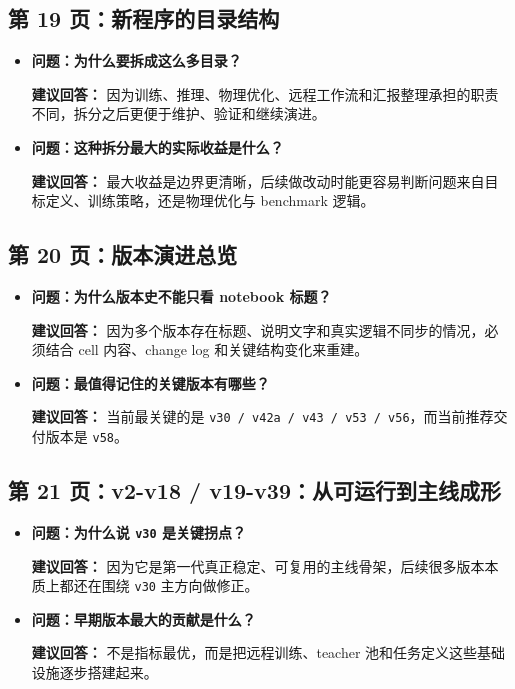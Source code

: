 \documentclass[12pt,a4paper]{ctexart}
\begin{document}
\subsection{第 19 页：新程序的目录结构}
\begin{itemize}
\item \textbf{问题：为什么要拆成这么多目录？}

\textbf{建议回答：} 因为训练、推理、物理优化、远程工作流和汇报整理承担的职责不同，拆分之后更便于维护、验证和继续演进。

\item \textbf{问题：这种拆分最大的实际收益是什么？}

\textbf{建议回答：} 最大收益是边界更清晰，后续做改动时能更容易判断问题来自目标定义、训练策略，还是物理优化与 benchmark 逻辑。
\end{itemize}

\subsection{第 20 页：版本演进总览}
\begin{itemize}
\item \textbf{问题：为什么版本史不能只看 notebook 标题？}

\textbf{建议回答：} 因为多个版本存在标题、说明文字和真实逻辑不同步的情况，必须结合 cell 内容、change log 和关键结构变化来重建。

\item \textbf{问题：最值得记住的关键版本有哪些？}

\textbf{建议回答：} 当前最关键的是 \texttt{v30 / v42a / v43 / v53 / v56}，而当前推荐交付版本是 \texttt{v58}。
\end{itemize}

\subsection{第 21 页：v2-v18 / v19-v39：从可运行到主线成形}
\begin{itemize}
\item \textbf{问题：为什么说 \texttt{v30} 是关键拐点？}

\textbf{建议回答：} 因为它是第一代真正稳定、可复用的主线骨架，后续很多版本本质上都还在围绕 \texttt{v30} 主方向做修正。

\item \textbf{问题：早期版本最大的贡献是什么？}

\textbf{建议回答：} 不是指标最优，而是把远程训练、teacher 池和任务定义这些基础设施逐步搭建起来。
\end{itemize}
\end{document}
